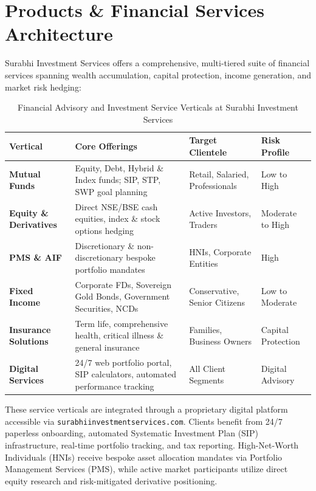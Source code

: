 \section{Products \& Financial Services Architecture}
Surabhi Investment Services offers a comprehensive, multi-tiered suite of financial services spanning wealth accumulation, capital protection, income generation, and market risk hedging:

\begin{table}[htbp]
    \centering
    \caption{Financial Advisory and Investment Service Verticals at Surabhi Investment Services}
    \label{tab:company_services}
    \footnotesize
    \renewcommand{\arraystretch}{0.95}
    \begin{tabularx}{\textwidth}{l p{4.8cm} p{4.0cm} l}
        \toprule
        \textbf{Vertical} & \textbf{Core Offerings} & \textbf{Target Clientele} & \textbf{Risk Profile} \\
        \midrule
        \textbf{Mutual Funds} & Equity, Debt, Hybrid \& Index funds; SIP, STP, SWP goal planning & Retail, Salaried, Professionals & Low to High \\
        \textbf{Equity \& Derivatives} & Direct NSE/BSE cash equities, index \& stock options hedging & Active Investors, Traders & Moderate to High \\
        \textbf{PMS \& AIF} & Discretionary \& non-discretionary bespoke portfolio mandates & HNIs, Corporate Entities & High \\
        \textbf{Fixed Income} & Corporate FDs, Sovereign Gold Bonds, Government Securities, NCDs & Conservative, Senior Citizens & Low to Moderate \\
        \textbf{Insurance Solutions} & Term life, comprehensive health, critical illness \& general insurance & Families, Business Owners & Capital Protection \\
        \textbf{Digital Services} & 24/7 web portfolio portal, SIP calculators, automated performance tracking & All Client Segments & Digital Advisory \\
        \bottomrule
    \end{tabularx}
\end{table}

These service verticals are integrated through a proprietary digital platform accessible via \texttt{surabhiinvestmentservices.com}. Clients benefit from 24/7 paperless onboarding, automated Systematic Investment Plan (SIP) infrastructure, real-time portfolio tracking, and tax reporting. High-Net-Worth Individuals (HNIs) receive bespoke asset allocation mandates via Portfolio Management Services (PMS), while active market participants utilize direct equity research and risk-mitigated derivative positioning.

